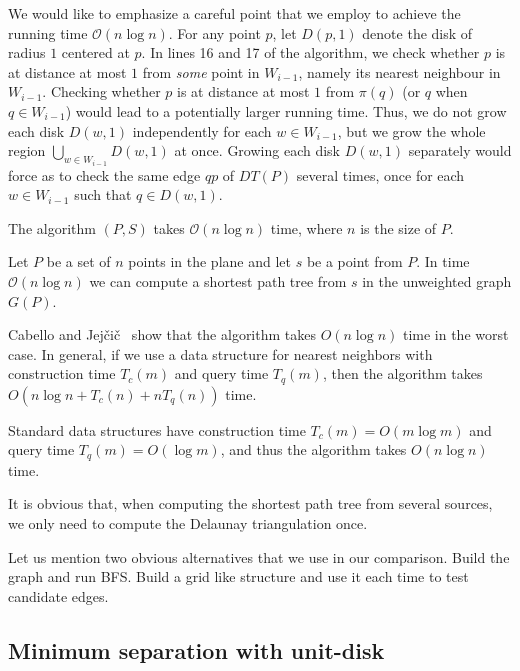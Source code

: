 \documentclass[a4paper,USenglish,numberwithinsect]{lipics}
\begin{document}
We would like to emphasize a careful point that we employ to achieve the running time $\mathcal{O}(n \log n)$. For any point $p$, let $D(p,1)$ denote the disk of radius $1$ centered at $p$.
In lines 16 and 17 of the algorithm, we check whether $p$ is at distance at most $1$ from \emph{some} point in $W_{i-1}$, namely its nearest neighbour in $W_{i-1}$. Checking whether $p$ is at distance at most $1$ from $\pi(q)$ (or $q$ when $q\in W_{i-1}$) would lead to a potentially larger running time. Thus, we do not grow each disk $D(w,1)$ independently for each $w\in W_{i-1}$, but we grow the whole region $\bigcup_{w\in W_{i-1}} D(w,1)$ at once. Growing each disk $D(w,1)$ separately would force as to check the same edge $qp$ of $DT(P)$ several times, once for each $w\in W_{i-1}$ such that $q\in D(w,1)$.

\begin{lemma}
\label{le:time}
	The algorithm $(P,S)$ takes
    $\mathcal{O}(n \log n)$ time, where $n$ is the size of $P$.
\end{lemma}

\begin{theorem}
  Let $P$ be a set of $n$ points in the plane and let $s$ be a point from $P$. 
  In time ${\mathcal O}(n \log n)$ we can compute a shortest path tree from $s$
  in the unweighted graph $G(P)$.
\end{theorem}

Cabello and Jej\v{c}i\v{c}~\cite{CJ15} show that the algorithm takes $O(n\log n)$ time
in the worst case. 
In general, if we use a data structure for nearest neighbors with construction time $T_c(m)$
and query time $T_q(m)$, then the algorithm takes $O(n\log n + T_c(n)+ n T_q(n))$ time.

Standard data structures have construction time $T_c(m)=O(m\log m)$ and 
query time $T_q(m)=O(\log m)$, and thus the algorithm takes $O(n\log n)$ time.

It is obvious that, when computing the shortest path tree from several sources,
we only need to compute the Delaunay triangulation once.

Let us mention two obvious alternatives that we use in our comparison.
Build the graph and run BFS.
Build a grid like structure and use it each time to test candidate edges.


\subsection{Minimum separation with unit-disk}
\label{sec:algorithm-separation}
\end{document}
